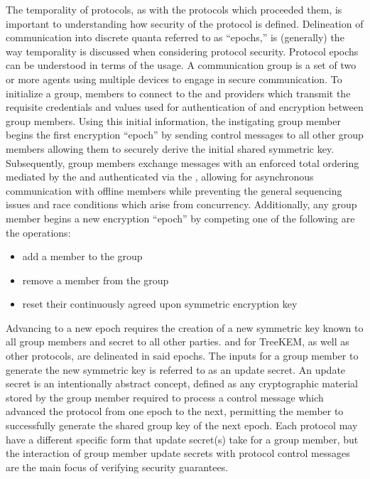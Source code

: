 The temporality of  protocols, as with the  protocols which proceeded them, is important to understanding how security of the protocol is defined.
Delineation of communication into discrete quanta referred to as ``epochs,'' is (generally) the way temporality is discussed when considering protocol security.
Protocol epochs can be understood in terms of the  usage.
A communication group is a set of two or more agents using multiple devices to engage in secure communication.
To initialize a group, members to connect to the  and  providers which transmit the requisite credentials and values used for authentication of and encryption between group members.
Using this initial information, the instigating group member begins the first encryption ``epoch'' by sending control messages to all other group members allowing them to securely derive the initial shared symmetric key.
Subsequently, group members exchange messages with an enforced total ordering mediated by the  and authenticated via the , allowing for asynchronous communication with offline members while preventing the general sequencing issues and race conditions which arise from concurrency.
Additionally, any group member begins a new encryption ``epoch'' by competing one of the following are the operations:

\begin{itemize}
  \item
    add a member to the group
  \item
    remove a member from the group
  \item
    reset their continuously agreed upon symmetric encryption key
  \end{itemize}

Advancing to a new epoch requires the creation of a new symmetric key known to all group members and secret to all other parties.
 and  for TreeKEM, as well as other  protocols, are delineated in said epochs.
The inputs for a group member to generate the new symmetric key is referred to as an update secret.
An update secret is an intentionally abstract concept, defined as any cryptographic material stored by the group member required to process a control message which advanced the protocol from one epoch to the next, permitting the member to successfully generate the shared group key of the next epoch.
Each protocol may have a different specific form that update secret(s) take for a group member, but the interaction of group member update secrets with protocol control messages are the main focus of verifying security guarantees.


